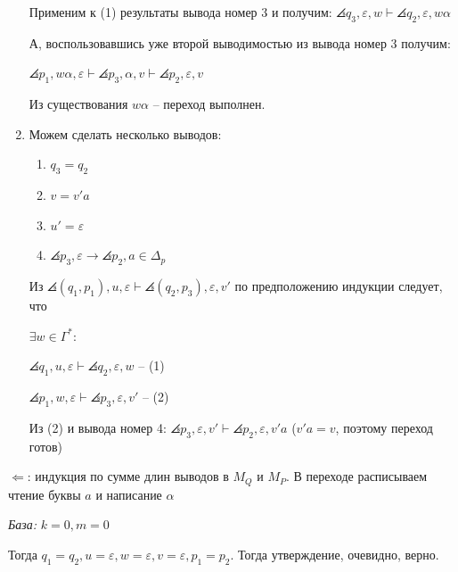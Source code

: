 \begin{enumerate}
    Применим к (1) результаты вывода номер 3 и получим:
    $\angles{q_3, \varepsilon, w} \vdash \angles{q_2, \varepsilon, w\alpha}$
    
    А, воспользовавшись уже второй выводимостью из вывода номер 3 получим:
    
    $\angles{p_1, w\alpha, \varepsilon} \vdash \angles{p_3, \alpha, v} \vdash \angles{p_2, \varepsilon, v}$
    
    Из существования $w\alpha$ -- переход выполнен.
    \item Можем сделать несколько выводов:
    \begin{enumerate}
        \item $q_3 = q_2$
        \item $v = v'a$
        \item $u' = \varepsilon$
        \item $\angles{p_3, \varepsilon} \rightarrow \angles{p_2, a} \in \Delta_p$
    \end{enumerate}
    
    Из $\angles{(q_1, p_1), u, \varepsilon} \vdash \angles{(q_2, p_3), \varepsilon, v'}$ по предположению индукции следует, что
    
    $\exists w \in \Gamma^*:$
    
    $\angles{q_1, u, \varepsilon} \vdash \angles{q_2, \varepsilon, w}$ -- (1)
    
    $\angles{p_1, w, \varepsilon} \vdash \angles{p_3, \varepsilon, v'}$ -- (2)
    
    Из (2) и вывода номер 4: $\angles{p_3, \varepsilon, v'} \vdash \angles{p_2, \varepsilon, v'a}$ ($v'a = v$, поэтому переход готов)
\end{enumerate}
\EndProof

$\Longleftarrow$: индукция по сумме длин выводов в $M_{Q}$ и $M_{P}$. В переходе расписываем чтение буквы $a$ и написание $\alpha$

\Proof
\textit{База:} $k = 0, m = 0$

Тогда $q_1 = q_2, u = \varepsilon, w = \varepsilon, v = \varepsilon, p_1 = p_2$. Тогда утверждение, очевидно, верно.\\

